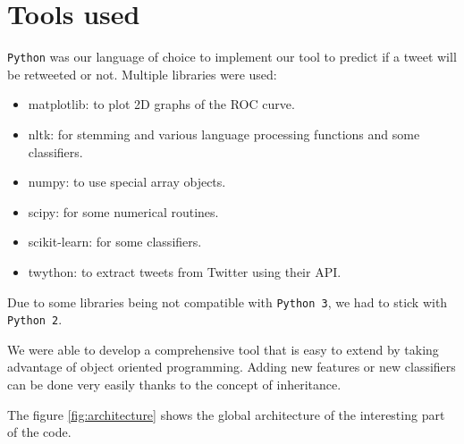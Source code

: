 \section{Tools used}
\label{sec:tools}

\verb|Python| was our language of choice to implement our tool to predict if a 
tweet will be retweeted or not. Multiple libraries were used:
\begin{itemize}
	\item matplotlib: to plot 2D graphs of the ROC curve.
	\item nltk: for stemming and various language processing functions and some 
		  classifiers.
	\item numpy: to use special array objects.
	\item scipy: for some numerical routines.
	\item scikit-learn: for some classifiers.
	\item twython: to extract tweets from Twitter using their API.
\end{itemize}

Due to some libraries being not compatible with \verb|Python 3|, we had to 
stick with \verb|Python 2|.

We were able to develop a comprehensive tool that is easy to extend by taking 
advantage of object oriented programming. Adding new features or new 
classifiers can be done very easily thanks to the concept of inheritance.

The figure \ref{fig:architecture} shows the global architecture of the 
interesting part of the code.

